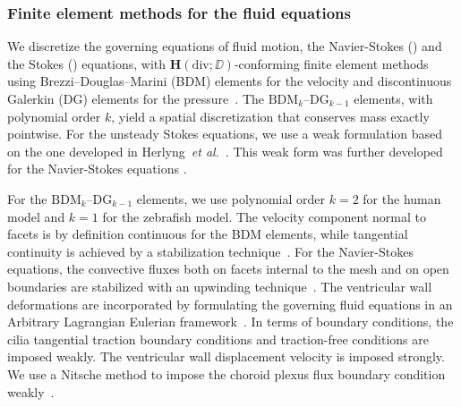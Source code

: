 \documentclass{template}
\begin{document}
\subsubsection{Finite element methods for the fluid equations}
We discretize the governing equations of fluid motion,
the Navier-Stokes ()
and the Stokes ()
equations, with $\bm{H}(\mathrm{div}; \DD)$-conforming finite element methods
using Brezzi--Douglas--Marini (BDM) elements for the velocity
and discontinuous Galerkin (DG)
elements for the pressure~\citep{Brezzi1985TwoProblems,Nedelec1986AIR3}.
The $\mathrm{BDM}_k$--$\mathrm{DG}_{k-1}$ elements, with polynomial order $k$,
yield a spatial discretization that conserves mass exactly pointwise.
For the unsteady Stokes equations, we use a weak formulation
based on the one developed in
Herlyng~\emph{et al.}~\citep{Herlyng2025AdvectionDiffusion}.
This weak form was further developed for the Navier-Stokes equations
\citep{Schroeder2018Towards,di2011mathematical}.

For the $\mathrm{BDM}_k$--$\mathrm{DG}_{k-1}$ elements, we use
polynomial order $k=2$ for the human model and $k=1$ for the 
zebrafish model. The velocity component normal to facets is by definition 
continuous for the BDM elements, while tangential continuity is achieved
by a stabilization technique~\citep{Hong2016AEquations}. 
For the Navier-Stokes equations, the convective fluxes both on facets
internal to the mesh and on open boundaries are stabilized with
an upwinding technique~\citep{Schroeder2018Towards,
di2011mathematical}. The ventricular wall deformations
are incorporated by formulating the governing fluid equations
in an Arbitrary Lagrangian Eulerian framework~\citep{Scovazzi2007LectureNotes,Duarte2004ALE}.
In terms of boundary conditions, the cilia tangential traction
boundary conditions and traction-free conditions are imposed weakly.
The ventricular wall displacement velocity is imposed strongly.
We use a Nitsche method to impose the choroid plexus flux boundary
condition weakly~\citep{Nitsche1971UberSind, benzaken2024constructing}.
\end{document}

